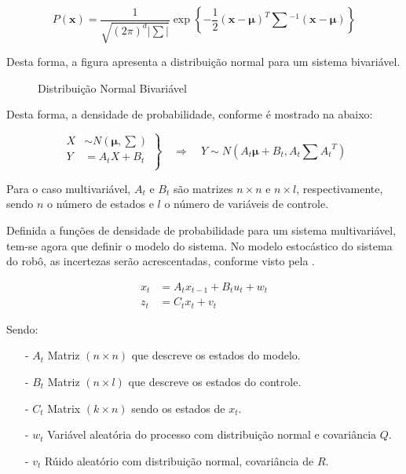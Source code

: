 \begin{equation}
    \label{eq::linearNd}
    P(\mathbf{x}) =\frac{1}{\sqrt{(2\pi)^{d}|\sum|}}\exp\left\{-\frac{1}{2} (\mathbf{x}-\boldsymbol\mu)^T\textstyle\sum{}^{-1}(\mathbf{x}-\boldsymbol\mu)\right\}
\end{equation}

Desta forma, a figura  apresenta a distribuição normal para um sistema bivariável.


\begin{figure}[!ht]
    \centering
    
    \caption{Distribuição Normal Bivariável}
    \label{fig::gauss2}
\end{figure}

Desta forma, a densidade de probabilidade, conforme é mostrado na  abaixo:

\begin{equation}
    \left.
    \begin{aligned}
            X & \sim N\left(\boldsymbol\mu, \textstyle\sum\right)\\
            Y & = {A}_tX + {B_t}\\
    \end{aligned} \right\}
    \quad \Rightarrow \quad Y \sim N\left( {A_t}\boldsymbol\mu+B_t, {A_t}\textstyle\sum {A_t}^T \right)
\end{equation}

Para o caso multivariável, ${A_t}$ e ${B_t}$ são matrizes $n \times n$ e $n \times l$, respectivamente, sendo $n$ o número de estados e $l$ o número de variáveis de controle.

Definida a funções de densidade de probabilidade para um sistema multivariável, tem-se agora que definir o modelo do sistema.
No modelo estocástico do sistema do robô, as incertezas serão acrescentadas, conforme visto pela  .

    \begin{equation} 
        \label{eq::mdinamic}
        \begin{aligned}
            x_t &= {A}_t x_{t-1} + {B}_t u_t +  w_t\\ 
        z_t &= {C}_t x_t + v_t
        \end{aligned}
        \end{equation}

    Sendo: 

    \begin{itemize}
        \item[-] ${A}_t$ Matriz $(n \times n)$ que descreve os estados do modelo.
        \item[-] ${B}_t$ Matriz $(n \times l)$ que descreve os estados do controle.
        \item[-] ${C}_t$ Matrix $(k\times n)$ sendo os estados de $x_t$.
        \item[-] $w_t$ Variável aleatória do processo com distribuição normal e covariância ${Q}$.
        \item[-] $v_t$ Rúido aleatório com distribuição normal, covariância de ${R}$.
    \end{itemize}

